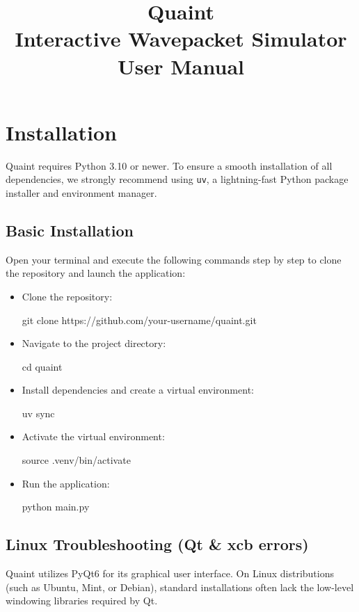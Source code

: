 \documentclass[11pt, a4paper]{article}
\title{\Huge \textbf{Quaint}\\ \Large Interactive Wavepacket Simulator \\ User Manual}
\author{}
\date{}
\begin{document}
\maketitle

\newpage

\tableofcontents

\newpage

\section{Installation}
Quaint requires Python 3.10 or newer. To ensure a smooth installation of all dependencies, we strongly recommend using \texttt{uv}, a lightning-fast Python package installer and environment manager.

\subsection{Basic Installation}
Open your terminal and execute the following commands step by step to clone the repository and launch the application:

\begin{itemize}
    \item Clone the repository:
\begin{terminalbox}
git clone https://github.com/your-username/quaint.git
\end{terminalbox}

    \item Navigate to the project directory:
\begin{terminalbox}
cd quaint
\end{terminalbox}

    \item Install dependencies and create a virtual environment:
\begin{terminalbox}
uv sync
\end{terminalbox}

    \item Activate the virtual environment:
\begin{terminalbox}
source .venv/bin/activate
\end{terminalbox}

    \item Run the application:
\begin{terminalbox}
python main.py
\end{terminalbox}
\end{itemize}

\subsection{Linux Troubleshooting (Qt \& xcb errors)}
Quaint utilizes PyQt6 for its graphical user interface. On Linux distributions (such as Ubuntu, Mint, or Debian), standard installations often lack the low-level windowing libraries required by Qt. 
\end{document}
